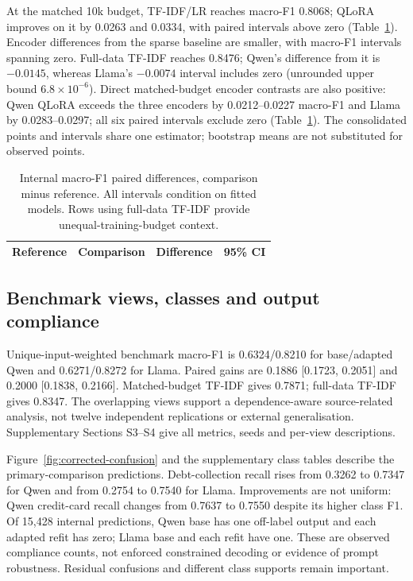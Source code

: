 \documentclass{elektr}
\renewcommand{\arraystretch}{0.94}
\begin{document}
At the matched 10k budget, TF-IDF/LR reaches macro-F1 0.8068; QLoRA improves on it by 0.0263 and 0.0334, with paired intervals above zero (Table~\ref{tab:contrasts}). Encoder differences from the sparse baseline are smaller, with macro-F1 intervals spanning zero. Full-data TF-IDF reaches 0.8476; Qwen's difference from it is $-0.0145$, whereas Llama's $-0.0074$ interval includes zero (unrounded upper bound $6.8\times10^{-6}$). Direct matched-budget encoder contrasts are also positive: Qwen QLoRA exceeds the three encoders by 0.0212--0.0227 macro-F1 and Llama by 0.0283--0.0297; all six paired intervals exclude zero (Table~\ref{tab:contrasts}). The consolidated points and intervals share one estimator; bootstrap means are not substituted for observed points.
\begin{table}[H]
\caption{Internal macro-F1 paired differences, comparison minus reference. All intervals condition on fitted models. Rows using full-data TF-IDF provide unequal-training-budget context.}
\label{tab:contrasts}\centering\small\renewcommand{\arraystretch}{1.08}
\begin{tabular}{llrr}\hline
Reference & Comparison & Difference & 95\% CI\\\hline

\end{tabular}
\end{table}

\subsection{Benchmark views, classes and output compliance}
\label{sec:legacy-errors}
Unique-input-weighted benchmark macro-F1 is 0.6324/0.8210 for base/adapted Qwen and 0.6271/0.8272 for Llama. Paired gains are 0.1886 [0.1723, 0.2051] and 0.2000 [0.1838, 0.2166]. Matched-budget TF-IDF gives 0.7871; full-data TF-IDF gives 0.8347. The overlapping views support a dependence-aware source-related analysis, not twelve independent replications or external generalisation. Supplementary Sections S3--S4 give all metrics, seeds and per-view descriptions.

Figure~\ref{fig:corrected-confusion} and the supplementary class tables describe the primary-comparison predictions. Debt-collection recall rises from 0.3262 to 0.7347 for Qwen and from 0.2754 to 0.7540 for Llama. Improvements are not uniform: Qwen credit-card recall changes from 0.7637 to 0.7550 despite its higher class F1. Of 15,428 internal predictions, Qwen base has one off-label output and each adapted refit has zero; Llama base and each refit have one. These are observed compliance counts, not enforced constrained decoding or evidence of prompt robustness. Residual confusions and different class supports remain important.
\end{document}
